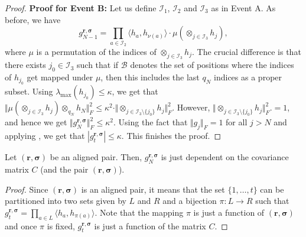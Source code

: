 \documentclass{toc}
\begin{document}
\begin{proof}
\smallskip
\noindent
\textbf{Proof for Event B: } Let us define $\mathcal{I}_1$, $\mathcal{I}_2$ and $\mathcal{I}_3$ as in Event A. As before, we have
\[
g^{\mathbf{r}, \boldsymbol{\sigma}}_{N-1} =\prod_{a \in \mathcal{I}_2} \langle h_a , h_{\nu(a)} \rangle \cdot \mu (\otimes_{j \in \mathcal{I}_3} h_j),
\]
where $\mu$ is a permutation of the indices of  $\otimes_{j \in \mathcal{I}_3} h_j$. The crucial difference is that there exists $j_0 \in \mathcal{I}_3$ such that if $\mathcal{B}$ denotes the set of positions where the indices of $h_{j_0}$ get mapped under $\mu$, then this includes the last $q_N$ indices as a proper subset. 
Using $\lambda_{\max}(h_{j_0}) \le \kappa$, we get that 
$\Vert \mu (\otimes_{j \in \mathcal{I}_3} h_{j}) \otimes_{q_N} h_N \Vert_F^2 \le \kappa^2 \cdot \Vert \otimes_{j \in \mathcal{I}_3 \setminus \{j_0\}} h_{j}\Vert_F^2. $
However, $\Vert \otimes_{j \in \mathcal{I}_3 \setminus \{j_0\}} h_{j}\Vert_F^2. =1$, and hence we get $\Vert g^{\mathbf{r}, \boldsymbol{\sigma}}_{N} \Vert_F^2 \le \kappa^2$.
 Using the fact that $\Vert g_j \Vert_F=1$ for all $j>N$ and applying , we get that $|g^{\mathbf{r}, \boldsymbol{\sigma}}_{t}|\le \kappa$. This finishes the proof.
\end{proof}

\begin{claim}
Let $(\mathbf{r}, \boldsymbol{\sigma})$ be an aligned pair. Then, $g^{\mathbf{r}, \boldsymbol{\sigma}}_{N}$ is just dependent on the covariance matrix $C$ (and the pair $(\mathbf{r}, \boldsymbol{\sigma})$). 
\end{claim}
\begin{proof}
Since $(\mathbf{r}, \boldsymbol{\sigma})$ is an aligned pair, it means that the set $\{1, \ldots, t\}$ can be partitioned into two sets given by $L$ and $R$ and a bijection $\pi : L \rightarrow R$  such that 
$g^{\mathbf{r}, \boldsymbol{\sigma}}_{t} = \prod_{a \in L} \langle h_a, h_{\pi(a)} \rangle$. Note that the mapping $\pi$ is just a function of $(\mathbf{r}, \boldsymbol{\sigma})$ and once $\pi$ is fixed, $g^{\mathbf{r}, \boldsymbol{\sigma}}_{t} $ is just a function of the matrix $C$. 
\end{proof}
\end{document}
